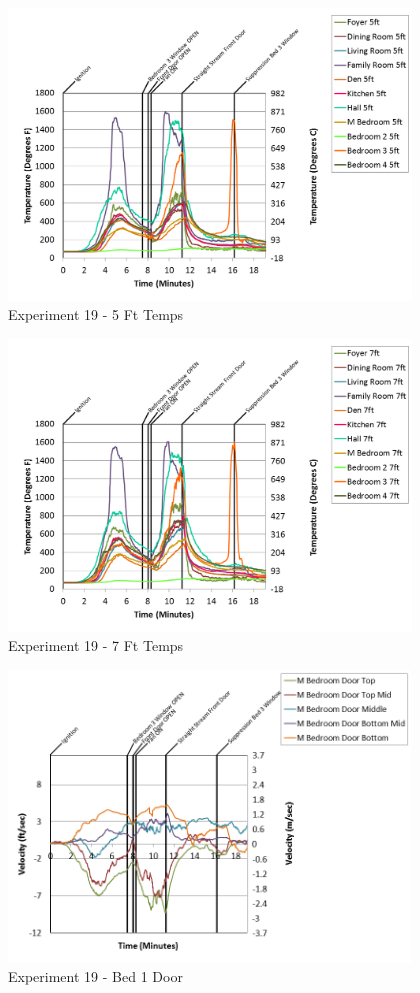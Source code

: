 \documentclass{article}
\begin{document}
\begin{appendices}
\begin{figure}[h!]
	\centering
	\includegraphics[height=3.05in]{0_Images/Results_Charts/Exp_19_Charts/5FtTemps.png}
	\caption{Experiment 19 - 5 Ft Temps}
\end{figure}


\begin{figure}[h!]
	\centering
	\includegraphics[height=3.05in]{0_Images/Results_Charts/Exp_19_Charts/7FtTemps.png}
	\caption{Experiment 19 - 7 Ft Temps}
\end{figure}

\clearpage

\begin{figure}[h!]
	\centering
	\includegraphics[height=3.05in]{0_Images/Results_Charts/Exp_19_Charts/Bed1Door.png}
	\caption{Experiment 19 - Bed 1 Door}
\end{figure}



\end{appendices}
\end{document}
